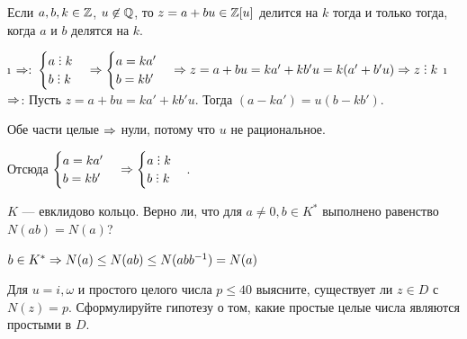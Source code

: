 \begin{problem}[11 (2.5)]
Если $a, b, k \in \mathbb{Z}$, $u\not \in \mathbb{Q}$, то $z= a+bu \in \mathbb{Z}[u]$ делится на $k$ тогда и только тогда, когда $a$ и $b$ делятся на $k$.
\end{problem}

\begin{solution}

\begin{itemize}
\i
  \(\Rightarrow:\)
  \(\begin{cases} a \Divby k \\ b \Divby k \end{cases} \Then \begin{cases} a = ka' \\ b = kb' \end{cases} \Then z = a+bu = ka'+kb'u=k(a'+b'u) \Then z \Divby k\)
\i
  \(\Rightarrow\):
  Пусть \(z = a + bu = ka' + kb'u\). Тогда \((a - ka') = u(b - kb')\).

  Обе части целые \(\Rightarrow\) нули, потому что \(u\) не рациональное.

  Отсюда \(\begin{cases} a = ka' \\ b = kb' \end{cases} \Then \begin{cases} a \Divby k \\ b \Divby k \end{cases}\).
\end{itemize}

\end{solution}

\begin{problem}[12(2.9 $\When$)]
$K$ — евклидово кольцо. Верно ли, что для $a \ne 0, b \in K^*$ выполнено равенство $N(ab) = N(a)$?
\end{problem}

\begin{solution}
\(b \in K^* \Rightarrow N(a) \le N(ab) \le N(abb^{-1}) = N(a)\)
\end{solution}

\begin{problem}[13 (3.2)]
Для $u=i,\omega$ и простого целого числа $p \leq 40$ выясните, существует ли $z \in D$ с $N(z)=p$. Сформулируйте гипотезу о том, какие простые целые числа являются простыми в $D$. 
\end{problem}

